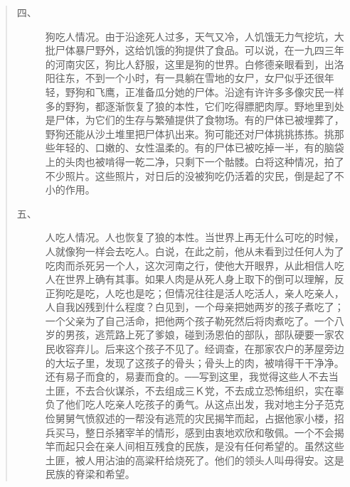 \begin{quote}
\begin{description}
		\item [四、] 狗吃人情况。由于沿途死人过多，天气又冷，人饥饿无力气挖坑，大批尸体暴尸野外，这给饥饿的狗提供了食品。可以说，在一九四三年的河南灾区，狗比人舒服，这里是狗的世界。白修德亲眼看到，出洛阳往东，不到一个小时，有一具躺在雪地的女尸，女尸似乎还很年轻，野狗和飞鹰，正准备瓜分她的尸体。沿途有许许多多像灾民一样多的野狗，都逐渐恢复了狼的本性，它们吃得膘肥肉厚。野地里到处是尸体，为它们的生存与繁殖提供了食物场。有的尸体已被埋葬了，野狗还能从沙土堆里把尸体扒出来。狗可能还对尸体挑挑拣拣。挑那些年轻的、口嫩的、女性温柔的。有的尸体已被吃掉一半，有的脑袋上的头肉也被啃得一乾二净，只剩下一个骷髅。白将这种情况，拍了不少照片。这些照片，对日后的没被狗吃仍活着的灾民，倒是起了不小的作用。\\
		
		\item [五、] 人吃人情况。人也恢复了狼的本性。当世界上再无什么可吃的时候，人就像狗一样会去吃人。白说，在此之前，他从未看到过任何人为了吃肉而杀死另一个人，这次河南之行，使他大开眼界，从此相信人吃人在世界上确有其事。如果人肉是从死人身上取下的倒可以理解，反正狗吃是吃，人吃也是吃；但情况往往是活人吃活人，亲人吃亲人，人自我凶残到什么程度？白见到，一个母亲把她两岁的孩子煮吃了；一个父亲为了自己活命，把他两个孩子勒死然后将肉煮吃了。一个八岁的男孩，逃荒路上死了爹娘，碰到汤恩伯的部队，部队硬要一家农民收容弃儿。后来这个孩子不见了。经调查，在那家农户的茅屋旁边的大坛子里，发现了这孩子的骨头；骨头上的肉，被啃得干干净净。还有易子而食的，易妻而食的。{\Add ──}写到这里，我觉得这些人不去当土匪，不去合伙谋杀，不去组成三Ｋ党，不去成立恐怖组织，实在辜负了他们吃人吃亲人吃孩子的勇气。从这点出发，我对地主分子范克俭舅舅气愤叙述的一帮没有逃荒的灾民揭竿而起，占据他家小楼，招兵买马，整日杀猪宰羊的情形，感到由衷地欢欣和敬佩。一个不会揭竿而起只会在亲人间相互残食的民族，是没有任何希望的。虽然这些土匪，被人用沾油的高粱秆给烧死了。他们的领头人叫毋得安。这是民族的脊梁和希望。\\
	\end{description}
\end{quote}